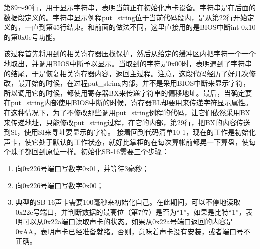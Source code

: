 \documentclass[12pt]{article}
\begin{document}
\begin{CJK}{UTF8}{gbsn}
第89～90行，用于显示字符串，表明当前正在初始化声卡设备。字符串是在后面的数据段定义的。字符串显示例程put\_{}string位于当前代码段内，是从第22行开始定义的，一直到第45行结束。和前面的做法不同，这里直接用的是BIOS中断int 0x10的第0x0e号功能。

该过程首先将用到的相关寄存器压栈保护，然后从给定的缓冲区内把字符一个一个地取出，并调用BIOS中断予以显示。当取到的字符是0x00时，表明遇到了字符串的结尾，于是恢复相关寄存器内容，返回主过程。注意，这段代码经历了好几次修改，最开始的时候，在过程put\_{}string内部，并不是采用BIOS中断来显示字符，所以调用它的时候，都使用寄存器BX来传递字符串的偏移地址。最后，当确定要在put\_{}string内部使用BIOS中断的时候，寄存器BL却要用来传递字符显示属性。在这种情况下，为了不修改那些调用put\_{}string例程的代码，让它们依然采用BX来传递地址，只能修改put\_{}string过程，在它的内部，第29行，把BX的内容传送到SI，使用SI来寻址要显示的字符。
接着回到代码清单10-1，现在的工作是初始化声卡，使它处于默认的工作状态，就好比掌柜的在每次算帐前都晃一下算盘，使每个珠子都回到原位一样。初始化SB-16需要三个步骤：
\begin{enumerate}
\item 向0x226号端口写数字0x01，并等待3毫秒；
\item 向0x226号端口写数字0x00；
\item 典型的SB-16声卡需要100毫秒来初始化自己。在此期间，可以不停地读取0x22e号端口，并判断数据的最高位（第7位）是否为“1”。如果是比特“1”，表明可以从0x22a端口读取声卡的状态。如果从0x22a号端口返回的内容是0xAA，表明声卡已经准备就绪。否则，意味着声卡没有安装，或者端口号不正确。
\end{enumerate}
\begin{comment}
为此，第93～95行用于向0x226号端口写数字1；第97～100行采用一个循环来进行延时。该延时并不精确，它只是将寄存器AX清零，然后减一（此时的值为0xFFFF），接着判断是否为零，不为零则继续将AX减一判断。在65536次循环之后，延时结束。
第102行，向同一端口写数字0。由于在延时后，寄存器AX的内容为零，故直接将AL中的内容写入端口0x226。在进行到这一步之后，软件应当读0x22e端口，如果第7位是“1”，再读0x22a端口，判断是否为0xaa。从声卡读取工作状态的步骤都一样，可能以后还会做这样的事，为此，专门定义了一个过程read\_{}dsp。
过程read\_{}dsp位于代码清单10-1的第65行，结束于第78行。第69～72行是一个循环，反复从0x22e端口读一个字节，直到发现其第7位变成“1”。然后，第73～78行，从0x22a端口读取状态字节，并返回。
回到主程序，在调用过程read\_{}dsp之后，第105行，判断刚才读取的状态字节是否为0xaa。如果不是，则显示错误信息后转移到程序结尾，进入停机状态；如果声卡复位正常，则转移到第112行接着执行。
10.3  声卡中断
10.3.1  中断和声音播放的关系
你可能很难理解中断和声音播放之间会有什么联系。事实上，在绝大多数时候，要播放声音，中断是必不可少的一环。

\end{comment}
\end{CJK}
\end{document}
